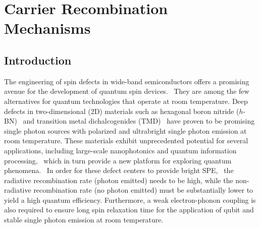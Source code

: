 \newcommand{\vecauto}[1]{\ensuremath{\vectorbold*{#1}}}
\newcommand{\vR}{\vecauto{R}}

\newcommand{\CN}{\ensuremath{\textrm{C}_\textrm{N}}}
\newcommand{\NBVN}{\ensuremath{\textrm{N}_\textrm{B}\textrm{V}_\textrm{N}}}
\newcommand{\CBVN}{\ensuremath{\textrm{C}_\textrm{B}\textrm{V}_\textrm{N}}}
\newcommand{\XBVN}{\ensuremath{\textrm{X}_\textrm{B}\textrm{V}_\textrm{N}}}
\newcommand{\OBOBVN}{\ensuremath{\textrm{O}_\textrm{B}\textrm{O}_\textrm{B}\textrm{V}_\textrm{N}}}

\newcommand{\Bandname}[1]{\ensuremath{
  \StrChar{#1}{1}[\chara]
  \StrChar{#1}{2}[\charb]
  \StrChar{#1}{3}[\charc]
  \StrChar{#1}{4}[\chard]
\IfEqCase{\chard}{
   {U}{\chara\mathrm{\charb}_{\charc}\uparrow}
   {D}{\chara\mathrm{\charb}_{\charc}\downarrow}
}[\PackageError{Bandname}{Undefined option for spin: \StrChar{#1}{4}}]
}}


\section{Carrier Recombination Mechanisms}


\subsection{Introduction}
The engineering of spin defects in wide-band semiconductors offers a promising avenue for the development of quantum spin devices.~\cite{aharonovich2011diamond,ladd2010quantum, seo2016design,dreyer2018first} They are among the few alternatives for quantum technologies that operate at room temperature. Deep defects in two-dimensional (2D) materials such as hexagonal boron nitride ($h$-BN)~\cite{aharonovich2014diamond,tran2016quantum,kim2018photonic,bourrellier2016bright,grosso2017tunable,li2017nonmagnetic,exarhos2017optical,exarhos2019magnetic,museur2008defect,sontheimer2017photodynamics,jungwirth2016temperature,jungwirth2017optical,noh2018stark} and transition metal dichalcogenides (TMD)~\cite{mak2016photonics,palacios2017large} have proven to be promising single photon sources with polarized and ultrabright single photon emission at room temperature. These materials exhibit unprecedented potential for several applications, including large-scale nanophotonics and quantum information processing,~\cite{beveratos2002single,obrien2009quantum,scarani2009the,aharonovich2016solid,vogl2018fabrication} which in turn provide a new platform for exploring quantum phenomena.~\cite{dreyer2018first}
In order for these defect centers to provide bright SPE,~\cite{aharonovich2011diamond,aharonovich2016solid} the radiative recombination rate (photon emitted) needs to be high, while the non-radiative recombination rate (no photon emitted) must be substantially lower to yield a high quantum efficiency.
Furthermore, a weak electron-phonon coupling is also required to ensure long spin relaxation time for the application of qubit and stable single photon emission at room temperature.

